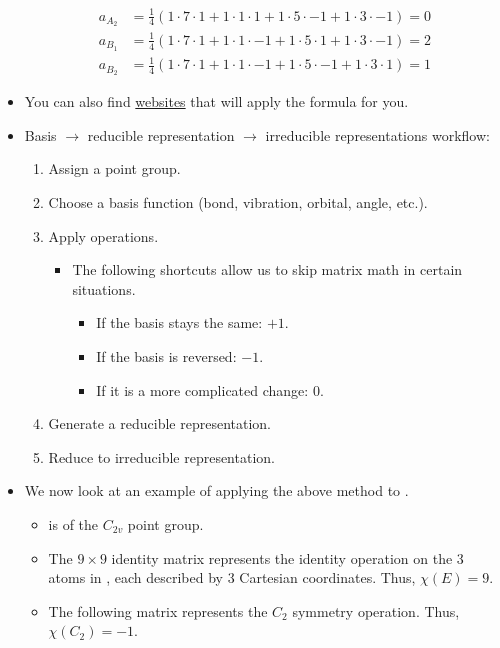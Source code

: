 \documentclass[../notes.tex]{subfiles}
\begin{document}
\begin{itemize}
\begin{align*}
        a_{A_2} &= \frac{1}{4}(1\cdot 7\cdot 1+1\cdot 1\cdot 1 +1\cdot 5\cdot -1+1\cdot 3\cdot -1) = 0\\
        a_{B_1} &= \frac{1}{4}(1\cdot 7\cdot 1+1\cdot 1\cdot -1+1\cdot 5\cdot 1 +1\cdot 3\cdot -1) = 2\\
        a_{B_2} &= \frac{1}{4}(1\cdot 7\cdot 1+1\cdot 1\cdot -1+1\cdot 5\cdot -1+1\cdot 3\cdot 1 ) = 1
    \end{align*}
    \item You can also find \href{http://symmetry.jacobs-university.de/}{websites} that will apply the formula for you.
    \item Basis $\to$ reducible representation $\to$ irreducible representations workflow:
    \begin{enumerate}
        \item Assign a point group.
        \item Choose a basis function (bond, vibration, orbital, angle, etc.).
        \item Apply operations.
        \begin{itemize}
            \item The following shortcuts allow us to skip matrix math in certain situations.
            \begin{itemize}
                \item If the basis stays the same: $+1$.
                \item If the basis is reversed: $-1$.
                \item If it is a more complicated change: $0$.
            \end{itemize}
        \end{itemize}
        \item Generate a reducible representation.
        \item Reduce to irreducible representation.
    \end{enumerate}
    \item We now look at an example of applying the above method to .
    \begin{itemize}
        \item {} is of the $C_{2v}$ point group.
        \item The $9\times 9$ identity matrix represents the identity operation on the 3 atoms in , each described by 3 Cartesian coordinates. Thus, $\chi(E)=9$.
        \item The following matrix represents the $C_2$ symmetry operation. Thus, $\chi(C_2)=-1$.

\end{itemize}
\end{itemize}
\end{document}

